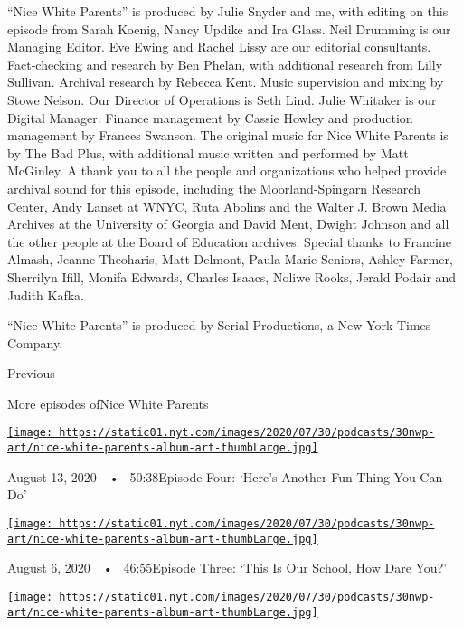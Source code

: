 ``Nice White Parents'' is produced by Julie Snyder and me, with editing
on this episode from Sarah Koenig, Nancy Updike and Ira Glass. Neil
Drumming is our Managing Editor. Eve Ewing and Rachel Lissy are our
editorial consultants. Fact-checking and research by Ben Phelan, with
additional research from Lilly Sullivan. Archival research by Rebecca
Kent. Music supervision and mixing by Stowe Nelson. Our Director of
Operations is Seth Lind. Julie Whitaker is our Digital Manager. Finance
management by Cassie Howley and production management by Frances
Swanson. The original music for Nice White Parents is by The Bad Plus,
with additional music written and performed by Matt McGinley. A thank
you to all the people and organizations who helped provide archival
sound for this episode, including the Moorland-Spingarn Research Center,
Andy Lanset at WNYC, Ruta Abolins and the Walter J. Brown Media Archives
at the University of Georgia and David Ment, Dwight Johnson and all the
other people at the Board of Education archives. Special thanks to
Francine Almash, Jeanne Theoharis, Matt Delmont, Paula Marie Seniors,
Ashley Farmer, Sherrilyn Ifill, Monifa Edwards, Charles Isaacs, Noliwe
Rooks, Jerald Podair and Judith Kafka.

``Nice White Parents'' is produced by Serial Productions, a New York
Times Company.

Previous

More episodes ofNice White Parents

\href{https://www.nytimes.com/2020/08/13/podcasts/nice-white-parents-school.html?action=click\&module=audio-series-bar\&region=header\&pgtype=Article}{\texttt{[image: https://static01.nyt.com/images/2020/07/30/podcasts/30nwp-art/nice-white-parents-album-art-thumbLarge.jpg]}}

August 13, 2020~~•~ 50:38Episode Four: `Here's Another Fun Thing You Can
Do'

\href{https://www.nytimes.com/2020/08/06/podcasts/episode-three-this-is-our-school-how-dare-you.html?action=click\&module=audio-series-bar\&region=header\&pgtype=Article}{\texttt{[image: https://static01.nyt.com/images/2020/07/30/podcasts/30nwp-art/nice-white-parents-album-art-thumbLarge.jpg]}}

August 6, 2020~~•~ 46:55Episode Three: `This Is Our School, How Dare
You?'

\href{https://www.nytimes.com/2020/07/30/podcasts/nice-white-parents-serial-2.html?action=click\&module=audio-series-bar\&region=header\&pgtype=Article}{\texttt{[image: https://static01.nyt.com/images/2020/07/30/podcasts/30nwp-art/nice-white-parents-album-art-thumbLarge.jpg]}}

